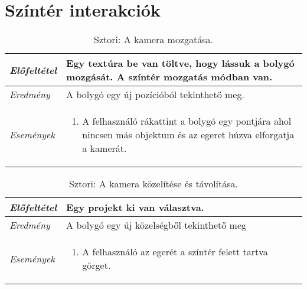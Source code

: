 \section{Színtér interakciók}


\begin{table}[H]
	\centering
	\begin{tabular}{ | m{} | m{} | }
		\hline
		\emph{Előfeltétel} & Egy textúra be van töltve, hogy lássuk a bolygó mozgását. A színtér mozgatás módban van. \\
		\hline
		\emph{Eredmény} & A bolygó egy új pozícióból tekinthető meg. \\
		\hline
		\hline
		\emph{Események} &

		\begin{enumerate}[itemsep=-1ex]
			\item A felhasználó rákattint a bolygó egy pontjára ahol nincsen más objektum és az egeret húzva elforgatja a kamerát.
		\end{enumerate}
		\\
		\hline
	\end{tabular}
	\caption{Sztori: A kamera mozgatása.}
	\label{tab:story-planet-pan}
\end{table}


\begin{table}[H]
	\centering
	\begin{tabular}{ | m{} | m{} | }
		\hline
		\emph{Előfeltétel} & Egy projekt ki van választva. \\
		\hline
		\emph{Eredmény} & A bolygó egy új közelségből tekinthető meg \\
		\hline
		\hline
		\emph{Események} &

		\begin{enumerate}[itemsep=-1ex]
			\item A felhasználó az egerét a színtér felett tartva görget.
		\end{enumerate}
		\\
		\hline
	\end{tabular}
	\caption{Sztori: A kamera közelítése és távolítása.}
	\label{tab:story-planet-pan}
\end{table}

